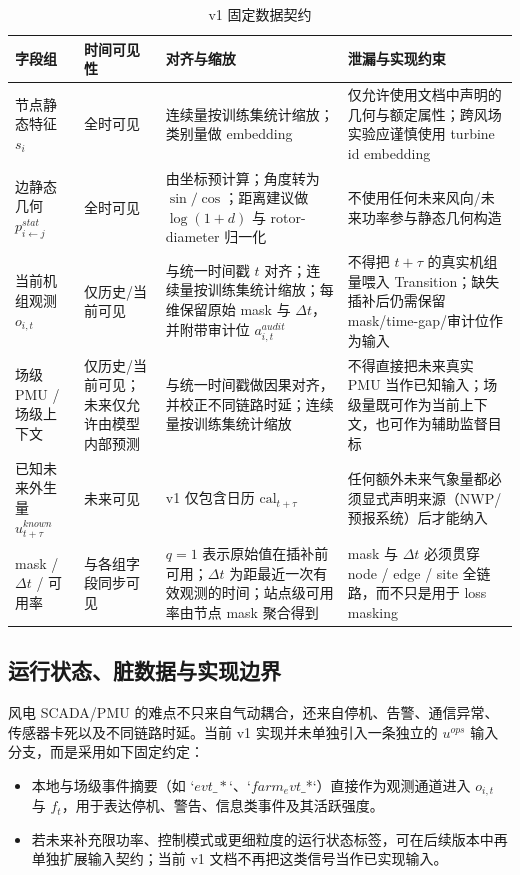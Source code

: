 \documentclass[11pt]{article}
\begin{document}
\begin{CJK}{UTF8}{gbsn}
\begin{table}[!h]
\centering
\caption{v1 固定数据契约}
\label{tab:data_contract_v1}
\renewcommand{\arraystretch}{1.15}
\begin{tabularx}{0.98\linewidth}{@{}L{3.1cm}L{2.8cm}L{4.0cm}X@{}}
\hline
\textbf{字段组} & \textbf{时间可见性} & \textbf{对齐与缩放} & \textbf{泄漏与实现约束} \\
\hline
节点静态特征 $s_i$ & 全时可见 & 连续量按训练集统计缩放；类别量做 embedding & 仅允许使用文档中声明的几何与额定属性；跨风场实验应谨慎使用 turbine id embedding \\
边静态几何 $p^{stat}_{i\leftarrow j}$ & 全时可见 & 由坐标预计算；角度转为 $\sin/\cos$；距离建议做 $\log(1+d)$ 与 rotor-diameter 归一化 & 不使用任何未来风向/未来功率参与静态几何构造 \\
当前机组观测 $o_{i,t}$ & 仅历史/当前可见 & 与统一时间戳 $t$ 对齐；连续量按训练集统计缩放；每维保留原始 mask 与 $\Delta t$，并附带审计位 $a^{audit}_{i,t}$ & 不得把 $t+\tau$ 的真实机组量喂入 Transition；缺失插补后仍需保留 mask/time-gap/审计位作为输入 \\
场级 PMU / 场级上下文 & 仅历史/当前可见；未来仅允许由模型内部预测 & 与统一时间戳做因果对齐，并校正不同链路时延；连续量按训练集统计缩放 & 不得直接把未来真实 PMU 当作已知输入；场级量既可作为当前上下文，也可作为辅助监督目标 \\
已知未来外生量 $u^{known}_{t+\tau}$ & 未来可见 & v1 仅包含日历 $\mathrm{cal}_{t+\tau}$ & 任何额外未来气象量都必须显式声明来源（NWP/预报系统）后才能纳入 \\
mask / $\Delta t$ / 可用率 & 与各组字段同步可见 & $q=1$ 表示原始值在插补前可用；$\Delta t$ 为距最近一次有效观测的时间；站点级可用率由节点 mask 聚合得到 & mask 与 $\Delta t$ 必须贯穿 node / edge / site 全链路，而不只是用于 loss masking \\
\hline
\end{tabularx}
\end{table}

\subsection{运行状态、脏数据与实现边界}

风电 SCADA/PMU 的难点不只来自气动耦合，还来自停机、告警、通信异常、传感器卡死以及不同链路时延。当前 v1 实现并未单独引入一条独立的 $u^{ops}$ 输入分支，而是采用如下固定约定：
\begin{itemize}
  \item 本地与场级事件摘要（如 `$evt\_*$`、`$farm_evt\_$*`）直接作为观测通道进入 $o_{i,t}$ 与 $f_t$，用于表达停机、警告、信息类事件及其活跃强度。
  \item 若未来补充限功率、控制模式或更细粒度的运行状态标签，可在后续版本中再单独扩展输入契约；当前 v1 文档不再把这类信号当作已实现输入。
\end{itemize}


\end{CJK}
\end{document}
